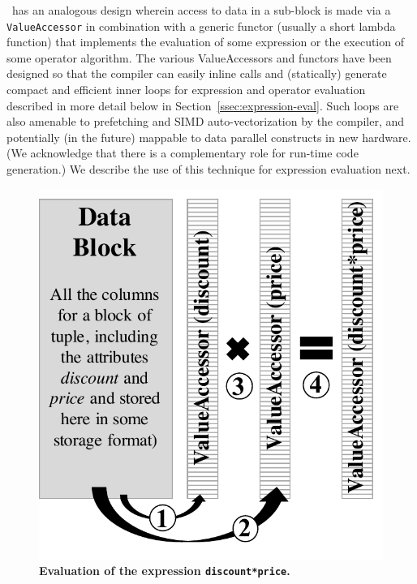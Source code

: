 \Quickstep\ has an analogous design wherein access to data in a sub-block is made via a \texttt{ValueAccessor} in combination with a generic functor (usually a short lambda function) that implements the evaluation of some expression or the execution of some operator algorithm. The various ValueAccessors and functors have been designed so that the compiler can easily inline calls and (statically) generate compact and efficient inner loops for expression and operator evaluation described in more detail below in Section~\ref{ssec:expression-eval}. Such loops are also amenable to prefetching and SIMD auto-vectorization by the compiler, and potentially (in the future) mappable to data parallel constructs in new hardware. (We acknowledge that there is a complementary role for run-time code generation.) We describe the use of this technique for expression evaluation next.


\begin{figure}
\centering
   \includegraphics[width=.7\columnwidth]{system/figures/VA.pdf}
   \caption{\textbf{Evaluation of the expression \texttt{discount*price}.}}
   \label{fig-template-VA}
\end{figure}


